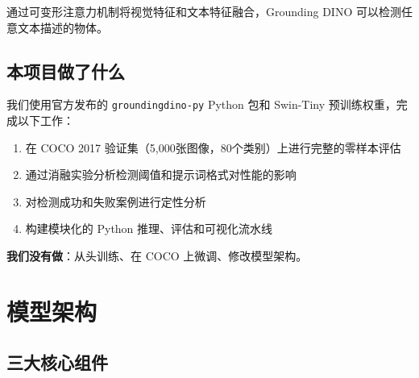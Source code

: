 \documentclass[12pt,a4paper]{ctexart}
\begin{document}
通过可变形注意力机制将视觉特征和文本特征融合，Grounding DINO 可以检测任意文本描述的物体。

\subsection{本项目做了什么}

我们使用官方发布的 \texttt{groundingdino-py} Python 包和 Swin-Tiny 预训练权重，完成以下工作：

\begin{enumerate}
    \item 在 COCO 2017 验证集（5,000张图像，80个类别）上进行完整的零样本评估
    \item 通过消融实验分析检测阈值和提示词格式对性能的影响
    \item 对检测成功和失败案例进行定性分析
    \item 构建模块化的 Python 推理、评估和可视化流水线
\end{enumerate}

\textbf{我们没有做}：从头训练、在 COCO 上微调、修改模型架构。

\section{模型架构}

\subsection{三大核心组件}
\end{document}
